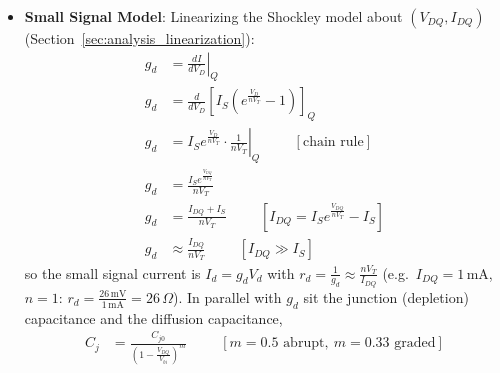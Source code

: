 \begin{enumerate}
\begin{itemize}
\begin{enumerate}
\begin{align*}
            \end{align*}
            since \(I_S\) is typically \(10^{-9}\) to \(10^{-15}\,\text{A}\) and
            every \(60\,\text{mV}\) below \(V_{TH}\) divides the current by 10.
          \item \textbf{Breakdown Regime:}
            Reverse breakdown arises from avalanche multiplication or Zener
            tunneling, mechanisms entirely absent from the minority-carrier
            diffusion current that the Shockley equation models. No asymptotic
            limit of the exponential term can reproduce this behavior, so it
            must be introduced as an independent term. Modeled with the same
            linear structure as the forward regime, using breakdown resistance
            \(R_{ZK}\):
            \[
              I \approx \frac{V_D + V_{BR}}{R_{ZK}} \hspace{1cm} \text{if } V_D < -V_{BR}
            \]
        \end{enumerate}
          \item \textbf{Small Signal Model}: Linearizing the Shockley model
        about \((V_{DQ}, I_{DQ})\) (Section~\ref{sec:analysis_linearization}):
        \begin{align*}
          g_d &= \left.\frac{dI}{dV_D}\right|_{Q} \\
          g_d &= \frac{d}{dV_D}\left[I_S\left(e^{\frac{V_D}{nV_T}} - 1\right)\right]_{Q} \\
          g_d &= \left. I_S e^{\frac{V_D}{nV_T}} \cdot \frac{1}{nV_T} \right|_{Q} \hspace{1cm} [\text{chain rule}] \\
          g_d &= \frac{I_S e^{\frac{V_{DQ}}{nV_T}}}{nV_T} \\
          g_d &= \frac{I_{DQ} + I_S}{nV_T} \hspace{1cm} \left[I_{DQ} = I_S e^{\frac{V_{DQ}}{nV_T}} - I_S\right] \\
          g_d &\approx \frac{I_{DQ}}{nV_T} \hspace{1cm} [I_{DQ} \gg I_S]
        \end{align*}
        so the small signal current is \(I_d = g_d V_d\) with
        \(r_d = \frac{1}{g_d} \approx \frac{nV_T}{I_{DQ}}\)
        (e.g.\ \(I_{DQ} = 1\,\text{mA}\), \(n = 1\):
        \(r_d = \frac{26\,\text{mV}}{1\,\text{mA}} = 26\,\Omega\)).
        In parallel with \(g_d\) sit the junction (depletion) capacitance
        and the diffusion capacitance,
        \begin{align*}
          C_j &= \frac{C_{j0}}{\left(1 - \frac{V_{DQ}}{V_{bi}}\right)^{m}} \hspace{1cm} [m = 0.5 \text{ abrupt},\ m = 0.33 \text{ graded}] \\

\end{align*}
\end{itemize}
\end{enumerate}
